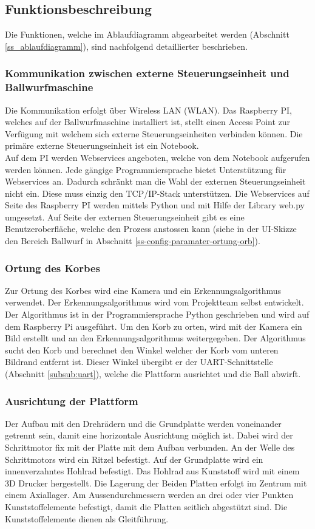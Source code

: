 \subsection{Funktionsbeschreibung}
Die Funktionen, welche im Ablaufdiagramm abgearbeitet werden (Abschnitt \ref{ss_ablaufdiagramm}), sind nachfolgend detaillierter beschrieben.

\subsubsection{Kommunikation zwischen externe Steuerungseinheit und Ballwurfmaschine}
Die Kommunikation erfolgt über Wireless LAN (WLAN). Das Raspberry PI, welches auf der Ballwurfmaschine installiert ist, stellt einen Access Point zur Verfügung mit welchem sich externe Steuerungseinheiten verbinden können. Die primäre externe Steuerungseinheit ist ein Notebook.\\
Auf dem PI werden Webservices angeboten, welche von dem Notebook aufgerufen werden können. Jede gängige Programmiersprache bietet Unterstützung für Webservices an. Dadurch schränkt man die Wahl der externen Steuerungseinheit nicht ein. Diese muss einzig den TCP/IP-Stack unterstützen. Die Webservices auf Seite des Raspberry PI werden mittels Python und mit Hilfe der Library web.py umgesetzt. Auf Seite der externen Steuerungseinheit gibt es eine Benutzeroberfläche, welche den Prozess anstossen kann (siehe in der UI-Skizze den Bereich Ballwurf in Abschnitt
\ref{ss-config-paramater-ortung-orb}).

\subsubsection{Ortung des Korbes}
Zur Ortung des Korbes wird eine Kamera und ein Erkennungsalgorithmus verwendet. Der Erkennungsalgorithmus wird vom Projektteam selbst entwickelt. Der Algorithmus ist in der Programmiersprache Python geschrieben und wird auf dem Raspberry Pi ausgeführt. Um den Korb zu orten, wird mit der Kamera ein Bild erstellt und an den Erkennungsalgorithmus weitergegeben. Der Algorithmus sucht den Korb und berechnet den Winkel welcher der Korb vom unteren Bildrand entfernt ist. Dieser Winkel übergibt er der UART-Schnittstelle (Abschnitt \ref{subsub:uart}), welche die Plattform ausrichtet und die Ball abwirft.

\subsubsection{Ausrichtung der Plattform}
Der Aufbau mit den Drehrädern und die Grundplatte werden voneinander getrennt sein, damit eine horizontale Ausrichtung möglich ist. Dabei wird der Schrittmotor fix mit der Platte mit dem Aufbau verbunden. An der Welle des Schrittmotors wird ein Ritzel befestigt. Auf der Grundplatte wird ein innenverzahntes Hohlrad befestigt. Das Hohlrad aus Kunststoff wird mit einem 3D Drucker hergestellt. Die Lagerung der Beiden Platten erfolgt im Zentrum mit einem Axiallager. Am Aussendurchmessern werden an drei oder vier Punkten Kunststoffelemente befestigt, damit die Platten seitlich abgestützt sind. Die Kunststoffelemente dienen als Gleitführung.

